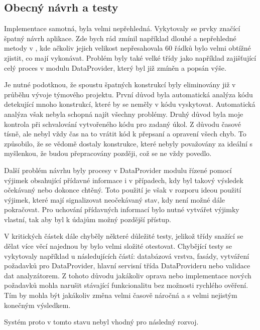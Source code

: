\documentclass[thesis=B,czech]{FITthesis}[2012/06/26]
\begin{document}
\subsection{Obecný návrh a testy}
Implementace samotná, byla velmi nepřehledná. Vykytovaly se prvky značící špatný návrh aplikace.
Zde bych rád zmínil například dlouhé a nepřehledné metody v
, kde ačkoliv jejich velikost 
nepřesahovala 60 řádků bylo velmi obtížné zjistit, co mají vykonávat. Problém byly také velké třídy
jako například  zajišťující celý proces v modulu DataProvider, který byl již zmíněn a popsán výše.
\par
Je nutné podotknou, že spoustu špatných konstrukcí byly eliminovány již v průběhu vývoje týmového projektu.
První důvod byla automatická analýza kódu detekující mnoho konstrukcí, které by se neměly v kódu vyskytovat. Automatická analýza
však nebyla schopná najít všechny problémy. Druhý důvod byla moje kontrola při schvalování vytvořeného kódu pro 
zadaný úkol. Z důvodu časové tísně, ale nebyl vždy čas na to vrátit kód k přepsaní a opravení všech chyb. To způsobilo, že
se vědomě dostaly konstrukce, které nebyly považovány za ideální s myšlenkou, že budou přepracovány později, což se ne vždy povedlo.
\par
Další problém návrhu byly procesy v DataProvider modulu řízené pomocí výjimek obsahující 
přídavné informace i v případech, kdy byl takový výsledek očekávaný nebo dokonce chtěný. 
Toto použití je však v rozporu ideou použití výjimek, které mají signalizovat neočekávaný stav, kdy není možné dále pokračovat.\cite{exception}
Pro uchování přídavných informací bylo nutné vytvářet výjimky vlastní, tak aby byl k údajům možný pozdější přístup.
\par
V kritických částek dále chyběly některé důležité testy, jelikož třídy snažící se dělat více věcí najednou by bylo velmi
složité otestovat. Chybějící testy se vykytovaly například u následujících částí: databázová vrstva, fasády, vytváření požadavků pro DataProvider,
hlavní servisní třída DataProvideru nebo validace dat analyzátorem. Z tohoto důvodu jakákoliv oprava nebo implementace nových požadavků 
mohla narušit stávající funkcionalitu bez možnosti rychlého ověření. Tím by mohla být jakákoliv změna velmi časově náročná a s velmi nejistým konečným výsledkem.

Systém proto v tomto stavu nebyl vhodný pro následný rozvoj.
\end{document}
